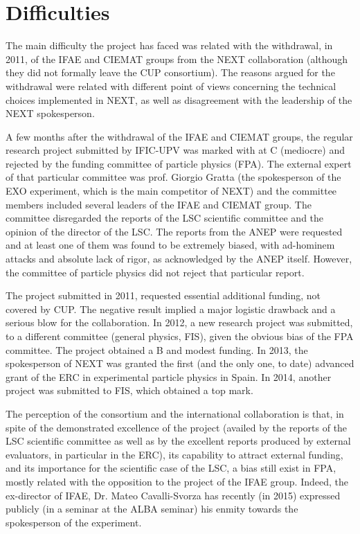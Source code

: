 \documentclass[a4paper,11pt,oneside]{article}
\begin{document}
\section{\bf \textsf{ Difficulties}} 

The main difficulty the project has faced was related with the withdrawal, in 2011, of the IFAE and CIEMAT groups from the NEXT collaboration (although they did not formally leave the CUP consortium). The reasons argued for the withdrawal were related with different point of views concerning the technical choices implemented in NEXT, as well as disagreement with the leadership of the NEXT spokesperson.

A few months after the withdrawal of the IFAE and CIEMAT groups, the regular research project submitted by IFIC-UPV was marked with at C (mediocre) and rejected by the funding committee of particle physics (FPA). The external expert of that particular committee was prof. Giorgio Gratta (the spokesperson of the EXO experiment, which is the main competitor of NEXT) and the committee members included several leaders of the IFAE and CIEMAT group. The committee disregarded the reports of the LSC scientific committee and the opinion of the director of the LSC. The reports from the ANEP were requested and at least one of them was found to be extremely biased, with ad-hominem attacks and absolute lack of rigor, as acknowledged by the ANEP itself. However, the committee of particle physics did not reject that particular report.

The project submitted in 2011, requested essential additional funding, not covered by CUP. The negative result implied a major logistic drawback and a serious blow for the collaboration. In 2012, a new research project was submitted, to a different committee (general physics, FIS), given the obvious bias of the FPA committee. The project obtained a B and modest funding. In 2013, the spokesperson of NEXT was granted the first (and the only one, to date) advanced grant of the ERC in experimental particle physics in Spain. In 2014, another project was submitted to FIS, which obtained a top mark. 

The perception of the consortium and the international collaboration is that, in spite of the demonstrated excellence of the project (availed by the reports of the LSC scientific committee as well as by the excellent reports produced by external evaluators, in particular in the ERC), its capability to attract external funding, and its importance for the scientific case of the LSC, a bias still exist in FPA, mostly related with the opposition to the project of the IFAE group. Indeed, the ex-director of IFAE, Dr. Mateo Cavalli-Svorza has recently (in 2015) expressed publicly (in a seminar at the ALBA seminar) his enmity towards the spokesperson of the experiment. 
\end{document}
